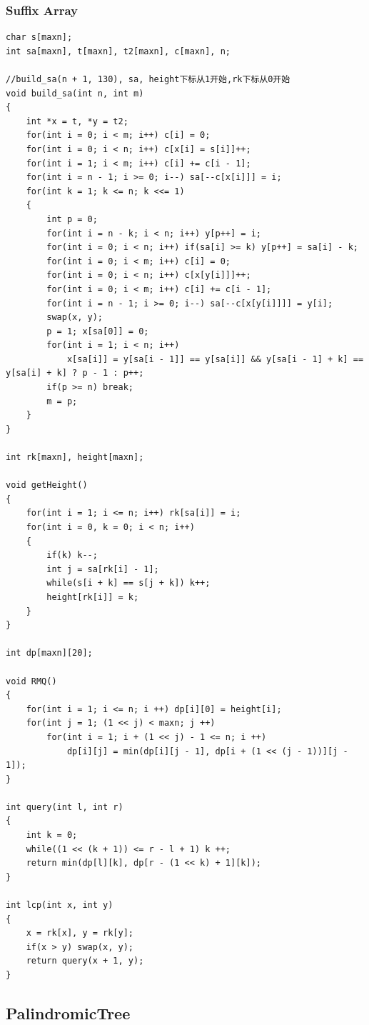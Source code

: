 \documentclass[twoside]{article}
\begin{document}
\subsubsection{Suffix Array}
\begin{lstlisting}
char s[maxn];
int sa[maxn], t[maxn], t2[maxn], c[maxn], n;

//build_sa(n + 1, 130), sa, height下标从1开始,rk下标从0开始
void build_sa(int n, int m) 
{
    int *x = t, *y = t2;
    for(int i = 0; i < m; i++) c[i] = 0;
    for(int i = 0; i < n; i++) c[x[i] = s[i]]++;
    for(int i = 1; i < m; i++) c[i] += c[i - 1];
    for(int i = n - 1; i >= 0; i--) sa[--c[x[i]]] = i;
    for(int k = 1; k <= n; k <<= 1)
    {
        int p = 0;
        for(int i = n - k; i < n; i++) y[p++] = i;
        for(int i = 0; i < n; i++) if(sa[i] >= k) y[p++] = sa[i] - k;
        for(int i = 0; i < m; i++) c[i] = 0;
        for(int i = 0; i < n; i++) c[x[y[i]]]++;
        for(int i = 0; i < m; i++) c[i] += c[i - 1];
        for(int i = n - 1; i >= 0; i--) sa[--c[x[y[i]]]] = y[i];
        swap(x, y);
        p = 1; x[sa[0]] = 0;
        for(int i = 1; i < n; i++)
            x[sa[i]] = y[sa[i - 1]] == y[sa[i]] && y[sa[i - 1] + k] == y[sa[i] + k] ? p - 1 : p++;
        if(p >= n) break;
        m = p;
    }
}

int rk[maxn], height[maxn];

void getHeight()
{
    for(int i = 1; i <= n; i++) rk[sa[i]] = i;
    for(int i = 0, k = 0; i < n; i++)
    {
        if(k) k--;
        int j = sa[rk[i] - 1];
        while(s[i + k] == s[j + k]) k++;
        height[rk[i]] = k;
    }
}

int dp[maxn][20];

void RMQ()
{
    for(int i = 1; i <= n; i ++) dp[i][0] = height[i];
    for(int j = 1; (1 << j) < maxn; j ++)
        for(int i = 1; i + (1 << j) - 1 <= n; i ++)
            dp[i][j] = min(dp[i][j - 1], dp[i + (1 << (j - 1))][j - 1]);
}

int query(int l, int r)
{
    int k = 0;
    while((1 << (k + 1)) <= r - l + 1) k ++;
    return min(dp[l][k], dp[r - (1 << k) + 1][k]);
}

int lcp(int x, int y)
{
    x = rk[x], y = rk[y];
    if(x > y) swap(x, y);
    return query(x + 1, y);
}\end{lstlisting}
\subsection{PalindromicTree}
\end{document}
